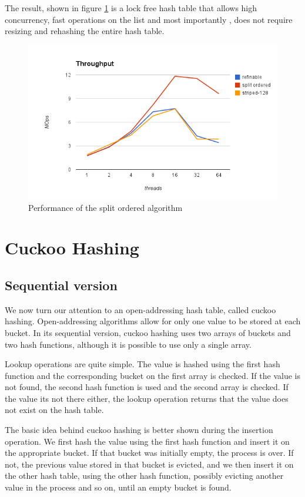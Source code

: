 The result, shown in figure \ref{hashes_split_ordered_perf} is a lock free hash table that allows high concurrency, fast operations on the list and most importantly , does not require resizing and rehashing the entire hash table.

\begin{figure}
 \centering
  \includegraphics[scale=0.7]{hashes_split_ordered_perf.png}
\caption{Performance of the split ordered algorithm}
\label{hashes_split_ordered_perf}
\end{figure}

\section{Cuckoo Hashing}
\subsection{Sequential version}

We now turn our attention to an open-addressing hash table, called cuckoo hashing. Open-addressing algorithms allow for only one value to be stored at each bucket. In its sequential version, cuckoo hashing uses two arrays of buckets and two hash functions, although it is possible to use only a single array. 

Lookup operations are quite simple. The value is hashed using the first hash function and the corresponding bucket on the first array is checked. If the value is not found, the second hash function is used and the second array is  checked.  If the value its not there either, the lookup operation returns that the value does not exist on the hash table.

The basic idea behind cuckoo hashing is better shown during the insertion operation. We first hash the value using the first hash function and insert it on the appropriate bucket. If that bucket was initially empty, the process is over. If not, the previous value stored in that bucket is evicted, and we then insert it  on the other hash table, using the other hash function, possibly evicting another value in the process and so on, until an empty bucket is found.


